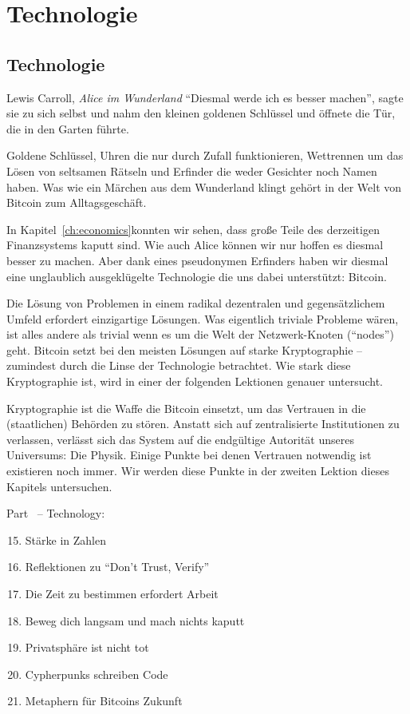 \part{Technologie}
\label{ch:technology}
\chapter*{Technologie}

\begin{chapquote}{Lewis Carroll, \textit{Alice im Wunderland}}
\enquote{Diesmal werde ich es besser machen}, sagte sie zu sich selbst und nahm
den kleinen goldenen Schlüssel und öffnete die Tür, die in den Garten führte.
\end{chapquote}

Goldene Schlüssel, Uhren die nur durch Zufall funktionieren, Wettrennen um das
Lösen von seltsamen Rätseln und Erfinder die weder Gesichter noch Namen haben.
Was wie ein Märchen aus dem Wunderland klingt gehört in der Welt von Bitcoin zum
Alltagsgeschäft.

In Kapitel~\ref{ch:economics}konnten wir sehen, dass große Teile des derzeitigen
Finanzsystems kaputt sind. Wie auch Alice können wir nur hoffen es diesmal
besser zu machen. Aber dank eines pseudonymen Erfinders haben wir diesmal eine
unglaublich ausgeklügelte Technologie die uns dabei unterstützt: Bitcoin.

Die Lösung von Problemen in einem radikal dezentralen und gegensätzlichem Umfeld
erfordert einzigartige Lösungen. Was eigentlich triviale Probleme wären, ist
alles andere als trivial wenn es um die Welt der Netzwerk-Knoten (“nodes”) geht.
Bitcoin setzt bei den meisten Lösungen auf starke Kryptographie – zumindest
durch die Linse der Technologie betrachtet. Wie stark diese Kryptographie ist,
wird in einer der folgenden Lektionen genauer untersucht.

Kryptographie ist die Waffe die Bitcoin einsetzt, um das Vertrauen in die
(staatlichen) Behörden zu stören. Anstatt sich auf zentralisierte Institutionen
zu verlassen, verlässt sich das System auf die endgültige Autorität unseres
Universums: Die Physik. Einige Punkte bei denen Vertrauen notwendig ist
existieren noch immer. Wir werden diese Punkte in der zweiten Lektion dieses
Kapitels untersuchen.
~

\begin{samepage}
Part~\ref{ch:technology} -- Technology:

\begin{enumerate}
  \setcounter{enumi}{14}
  \item Stärke in Zahlen
  \item Reflektionen zu \enquote{Don't Trust, Verify}
  \item Die Zeit zu bestimmen erfordert Arbeit
  \item Beweg dich langsam und mach nichts kaputt
  \item Privatsphäre ist nicht tot
  \item Cypherpunks schreiben Code
  \item Metaphern für Bitcoins Zukunft
\end{enumerate}
\end{samepage}

